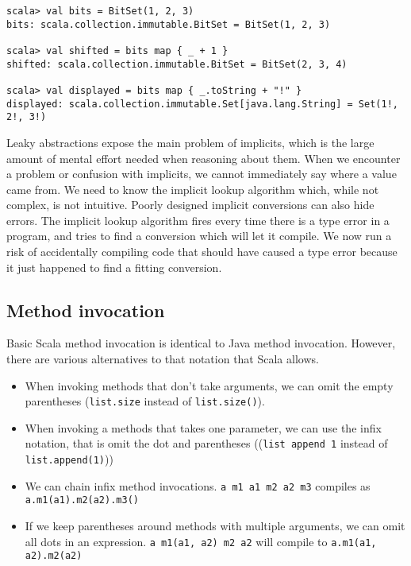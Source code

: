 \begin{lstlisting}[caption=Bitset example, label=code:bitset]
scala> val bits = BitSet(1, 2, 3)
bits: scala.collection.immutable.BitSet = BitSet(1, 2, 3)

scala> val shifted = bits map { _ + 1 }
shifted: scala.collection.immutable.BitSet = BitSet(2, 3, 4)

scala> val displayed = bits map { _.toString + "!" }
displayed: scala.collection.immutable.Set[java.lang.String] = Set(1!, 2!, 3!)
\end{lstlisting}

Leaky abstractions expose the main problem of implicits, which is the large amount of mental effort needed when reasoning about them.
When we encounter a problem or confusion with implicits, we cannot immediately say where a value came from.
We need to know the implicit lookup algorithm which, while not complex, is not intuitive.
Poorly designed implicit conversions can also hide errors.
The implicit lookup algorithm fires every time there is a type error in a program, and tries to find a conversion which will let it compile.
We now run a risk of accidentally compiling code that should have caused a type error because it just happened to find a fitting conversion.

\subsection{Method invocation}

Basic Scala method invocation is identical to Java method invocation.
However, there are various alternatives to that notation that Scala allows.

\begin{itemize}
	\item When invoking methods that don't take arguments, we can omit the empty parentheses (\texttt{list.size} instead of \texttt{list.size()}).
	\item When invoking a methods that takes one parameter, we can use the infix notation, that is omit the dot and parentheses ((\texttt{list append 1} instead of \texttt{list.append(1)}))
	\item We can chain infix method invocations.
\texttt{a m1 a1 m2 a2 m3} compiles as\\ \texttt{a.m1(a1).m2(a2).m3()}
	\item If we keep parentheses around methods with multiple arguments, we can omit all dots in an expression.
\texttt{a m1(a1, a2) m2 a2} will compile to \texttt{a.m1(a1, a2).m2(a2)}
\end{itemize}

